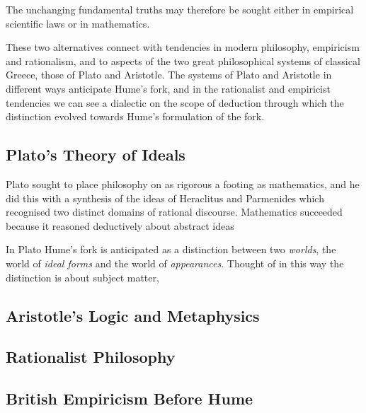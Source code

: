 The unchanging fundamental truths may therefore be sought either in empirical
scientific laws or in mathematics.

These two alternatives connect with tendencies in modern philosophy,
empiricism and rationalism, and to aspects of the two great
philosophical systems of classical Greece, those of Plato and Aristotle.
The systems of Plato and Aristotle in different ways anticipate Hume's
fork, and in the rationalist and empiricist tendencies we can see a
dialectic on the scope of deduction through which the distinction
evolved towards Hume's formulation of the fork. 

\subsection{Plato's Theory of Ideals}

Plato sought to place philosophy on as rigorous a footing as
mathematics, and he did this with a synthesis of the ideas of
Heraclitus and Parmenides which recognised two distinct domains of
rational discourse.
Mathematics succeeded because it reasoned deductively about abstract ideas


In Plato Hume's fork is anticipated as a distinction between two \emph{worlds}, the world of \emph{ideal forms} and the world of \emph{appearances}.
Thought of in this way the distinction is about subject matter, 






\subsection{Aristotle's Logic and Metaphysics}


\subsection{Rationalist Philosophy}

\subsection{British Empiricism Before Hume}

